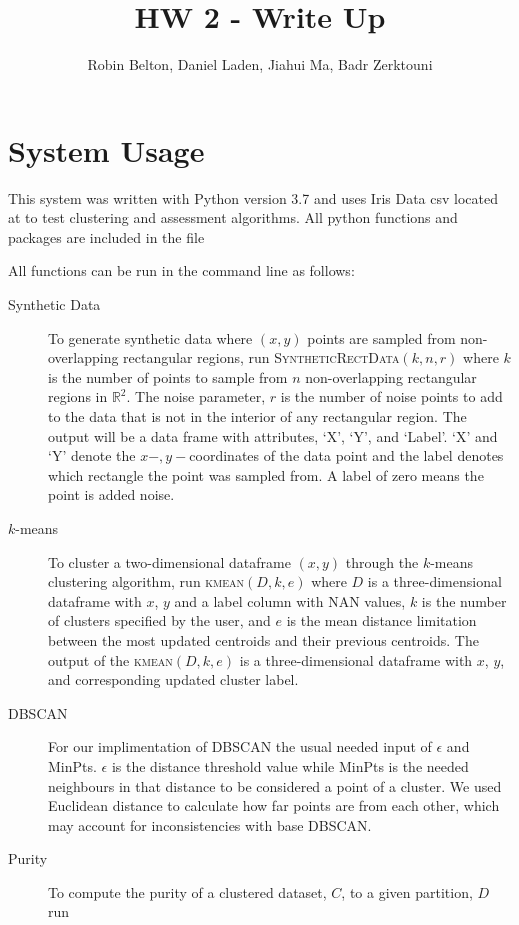 \documentclass[psamsfonts,onesided,10pt]{amsart}
\title{HW 2 - Write Up}
\author{Robin Belton, Daniel Laden, Jiahui Ma,  Badr Zerktouni}
\begin{document}
\maketitle

\section{System Usage}

This system was written with Python version 3.7 and uses Iris Data csv located at  
to test clustering and assessment algorithms. All python functions and packages are included in the  file 

All functions can be run in the command line as follows:

\begin{description}
\item[Synthetic Data] To generate synthetic data where $(x,y)$ points are sampled from 
non-overlapping rectangular regions, run \textsc{SyntheticRectData}$(k,n,r)$ where $k$ is the 
number of points to sample from $n$ non-overlapping rectangular regions in $\mathbb{R}^2$. 
The noise parameter, $r$  is the number of noise points to add to the data that is not in the interior 
of any rectangular region. The output will be a data frame with attributes, `X', `Y', and `Label'. 
`X' and `Y' denote the $x-,y-$coordinates of the data point and the label denotes which rectangle 
the point was sampled from. A label of zero means the point is added noise.
\item[$k$-means] To cluster a two-dimensional dataframe $(x,y)$ through the $k$-means 
clustering algorithm, run \textsc{kmean}$(D,k,e)$ where $D$ is a three-dimensional dataframe with 
$x$, $y$ and a label column with NAN values, $k$ is the number of clusters specified by the user, 
and $e$ is the mean distance limitation between the most updated centroids and their previous 
centroids. The output of the \textsc{kmean}$(D,k,e)$ is a three-dimensional dataframe with $x$, $y$, 
and corresponding updated cluster label.
\item[DBSCAN] For our implimentation of DBSCAN the usual needed input of $\epsilon$ and MinPts. $\epsilon$ is the distance threshold value while MinPts is the needed neighbours in that distance to be considered a point of a cluster. We used Euclidean distance to calculate how far points are from each other, which may account for inconsistencies with base DBSCAN.
\item[Purity]  To compute the purity of a clustered dataset, $C$, to a given partition, $D$ run 

\end{description}
\end{document}
